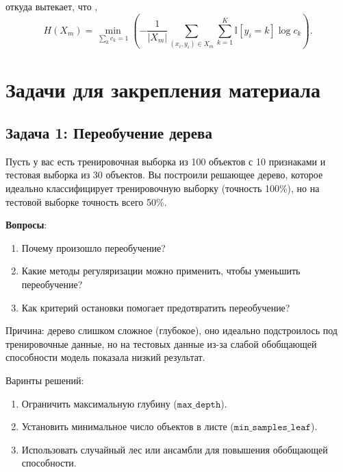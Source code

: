 откуда вытекает, что
,
\[
H(X_m) = \min_{\sum_k c_k = 1} \left( -\frac{1}{|X_m|} \sum_{(x_i, y_i) \in X_m} \sum_{k=1}^K \mathbb{I}[y_i = k] \log c_k \right).
\]

\section{Задачи для закрепления материала}
\subsection{Задача 1: Переобучение дерева}
Пусть у вас есть тренировочная выборка из 100 объектов с 10 признаками и тестовая выборка из 30 объектов. Вы построили решающее дерево, которое идеально классифицирует тренировочную выборку (точность 100\%), но на тестовой выборке точность всего 50\%.

\textbf{Вопросы}:
\begin{enumerate}
    \item Почему произошло переобучение?
    \item Какие методы регуляризации можно применить, чтобы уменьшить переобучение?
    \item Как критерий остановки помогает предотвратить переобучение?
\end{enumerate}
\begin{solution}
Причина: дерево слишком сложное (глубокое), оно идеально подстроилось под тренировочные данные, но на тестовых данные из-за слабой обобщающей способности модель показала низкий результат.

Варинты решений:
\begin{enumerate}
    \item Ограничить максимальную глубину (\(\texttt{max\_depth}\)).
    \item Установить минимальное число объектов в листе (\(\texttt{min\_samples\_leaf}\)).
    \item Использовать случайный лес или ансамбли для повышения обобщающей способности.
\end{enumerate}
\end{solution}

